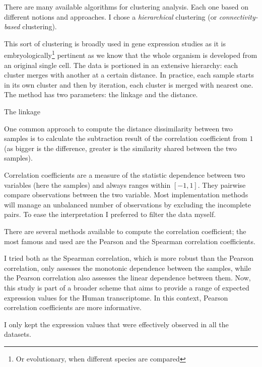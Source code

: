 There are many available algorithms for clustering analysis.
Each one based on different notions and approaches.
I chose a \emph{hierarchical} clustering (or \emph{connectivity-based} clustering).

This sort of clustering is broadly used in gene expression studies as it is
embryologically\footnote{Or evolutionary, when different species are compared}
pertinent as we know that the whole organism is developed from
an original single cell. The data is portioned in an extensive hierarchy:
each cluster merges with another at a certain distance.
In practice, each sample starts in its own cluster and then
by iteration, each cluster is merged with nearest one. The method has
two parameters: the linkage and the distance.

The linkage

One common approach to compute the distance dissimilarity
between two samples is to calculate the subtraction result of
the correlation coefficient from $1$ (as bigger is the difference, greater is
the similarity shared between the two samples).

Correlation coefficients are a measure of the statistic dependence between two
variables (here the samples) and always ranges within $[-1,1]$. They pairwise
compare observations between the two variable. Most implementation methods
will manage an unbalanced number of observations by excluding the incomplete pairs.
To ease the interpretation I preferred to filter the data  myself.

There are several methods available to compute the correlation coefficient; the
most famous and used are the Pearson and the Spearman correlation coefficients.

I tried both as the Spearman correlation, which is more robust than the Pearson
correlation, only assesses the monotonic dependence between the samples, while
the Pearson correlation also assesses the linear dependence between them.
Now, this study is part of a broader scheme that aims to provide 
a range of expected expression values for the Human transcriptome. In this context,
Pearson correlation coefficients are more informative.






I only kept the expression values that were effectively observed in all the datasets.

















